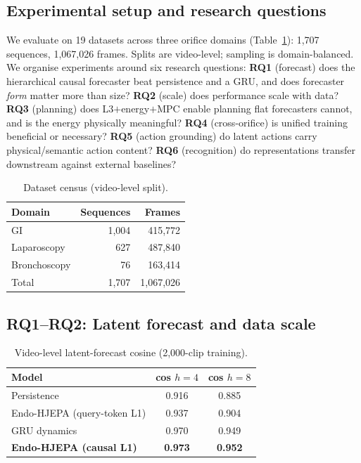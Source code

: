 \documentclass[final,3p,times,twocolumn]{elsarticle}
\begin{document}
\subsection{Experimental setup and research questions}
We evaluate on 19 datasets across three orifice domains (Table~\ref{tab:census}): 1,707 sequences, 1,067,026 frames. Splits are video-level; sampling is domain-balanced. We organise experiments around six research questions: \textbf{RQ1} (forecast) does the hierarchical causal forecaster beat persistence and a GRU, and does forecaster \emph{form} matter more than size? \textbf{RQ2} (scale) does performance scale with data? \textbf{RQ3} (planning) does L3$+$energy$+$MPC enable planning flat forecasters cannot, and is the energy physically meaningful? \textbf{RQ4} (cross-orifice) is unified training beneficial or necessary? \textbf{RQ5} (action grounding) do latent actions carry physical/semantic action content? \textbf{RQ6} (recognition) do representations transfer downstream against external baselines?

\begin{table}[t]
\centering
\caption{Dataset census (video-level split).}
\label{tab:census}
\small
\begin{tabular}{lrr}
\toprule
Domain & Sequences & Frames \\
\midrule
GI & 1,004 & 415,772 \\
Laparoscopy & 627 & 487,840 \\
Bronchoscopy & 76 & 163,414 \\
\midrule
Total & 1,707 & 1,067,026 \\
\bottomrule
\end{tabular}
\end{table}

\subsection{RQ1--RQ2: Latent forecast and data scale}
\begin{table}[t]
\centering
\caption{Video-level latent-forecast cosine (2,000-clip training).}
\label{tab:forecast}
\small
\begin{tabular}{lcc}
\toprule
Model & cos $h{=}4$ & cos $h{=}8$ \\
\midrule
Persistence & 0.916 & 0.885 \\
Endo-HJEPA (query-token L1) & 0.937 & 0.904 \\
GRU dynamics & 0.970 & 0.949 \\
\textbf{Endo-HJEPA (causal L1)} & \textbf{0.973} & \textbf{0.952} \\
\bottomrule
\end{tabular}
\end{table}
\end{document}
